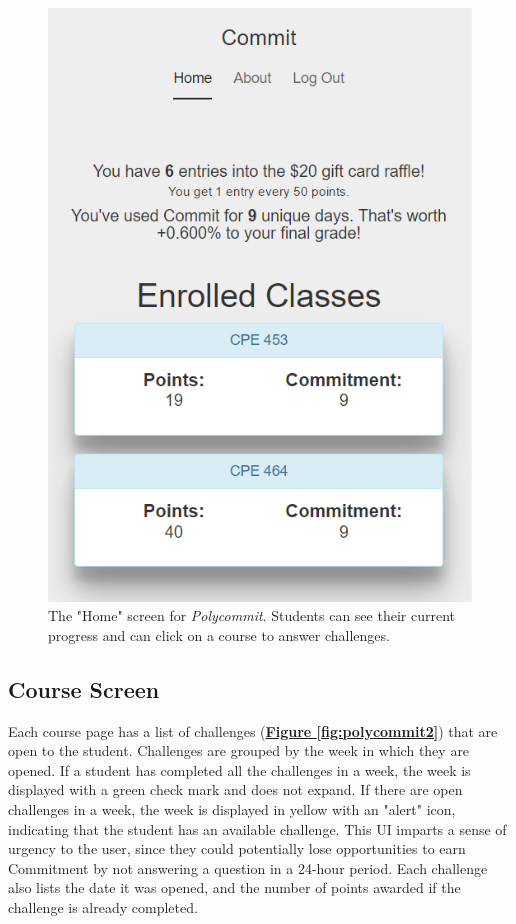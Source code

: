 \begin{figure}[h]
	\includegraphics{figures/polycommit-screen}
	\caption{The "Home" screen for \textit{Polycommit}. Students can see their current progress and can click on a course to answer challenges.}
	\label{fig:polycommit1}
\end{figure}

\subsection{Course Screen}
\par Each course page has a list of challenges (\textbf{\hyperref[fig:polycommit2]{Figure \ref*{fig:polycommit2}}}) that are open to the student. Challenges are grouped by the week in which they are opened. If a student has completed all the challenges in a week, the week is displayed with a green check mark and does not expand. If there are open challenges in a week, the week is displayed in yellow with an "alert" icon, indicating that the student has an available challenge. This UI imparts a sense of urgency to the user, since they could potentially lose opportunities to earn Commitment by not answering a question in a 24-hour period. Each challenge also lists the date it was opened, and the number of points awarded if the challenge is already completed.

